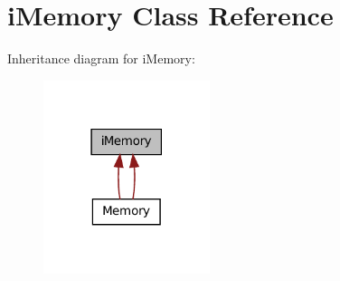 \hypertarget{classiMemory}{
\section{iMemory Class Reference}
\label{classiMemory}
}


Inheritance diagram for iMemory:\nopagebreak
\begin{figure}[H]
\begin{center}
\leavevmode
\includegraphics[width=138pt]{classiMemory__inherit__graph}
\end{center}
\end{figure}
